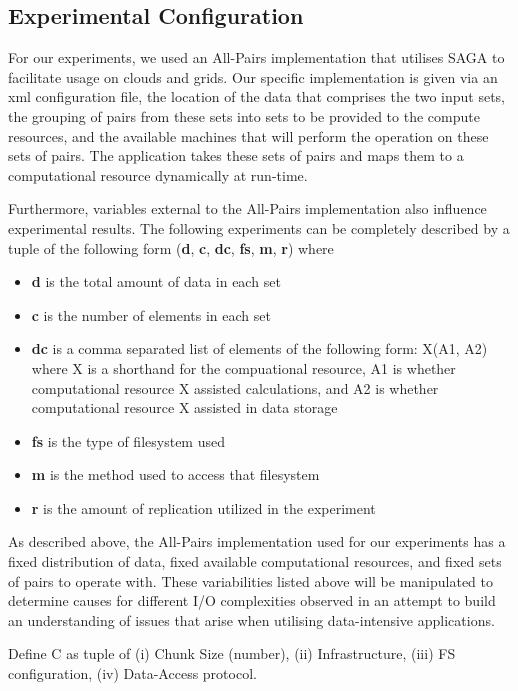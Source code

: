 \documentclass{rspublic}
\begin{document}
\subsection{Experimental Configuration}

For our experiments, we used an All-Pairs implementation that utilises
SAGA to facilitate usage on clouds and grids. Our specific
implementation is given via an xml configuration file, the location of
the data that comprises the two input sets, the grouping of pairs from
these sets into sets to be provided to the compute resources, and the
available machines that will perform the operation on these sets of
pairs.  The application takes these sets of pairs and maps them to a
computational resource dynamically at run-time.

Furthermore, variables external to the All-Pairs implementation also
influence experimental results. The following experiments can be
completely described by a tuple of the following form (\textbf{d},
\textbf{c}, \textbf{dc}, \textbf{fs}, \textbf{m}, \textbf{r}) where

\begin{itemize} 
\item \textbf{d} is the total amount of data in each set
\item \textbf{c} is the number of elements in each set
\item \textbf{dc} is a comma separated list of elements of the following
form: X(A1, A2) where X is a shorthand for the compuational resource, A1
is whether computational resource X assisted calculations, and A2 is
whether computational resource X assisted in data storage
\item \textbf{fs} is the type of filesystem used
\item \textbf{m} is the method used to access that filesystem
\item \textbf{r} is the amount of replication utilized in the experiment
\end{itemize}

As described above, the All-Pairs implementation used for our
experiments has a fixed distribution of data, fixed available
computational resources, and fixed sets of pairs to operate with.
These variabilities listed above will be manipulated to determine causes
for different I/O complexities observed in an attempt to build an
understanding of issues that arise when utilising data-intensive
applications.

Define C as  tuple of (i) Chunk Size (number), (ii) Infrastructure,
(iii) FS configuration, (iv) Data-Access protocol.
\end{document}

